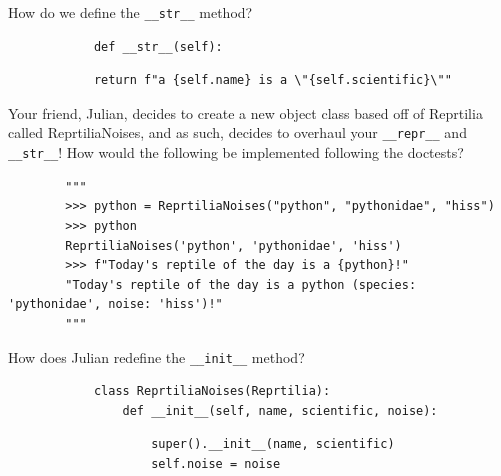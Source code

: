 \begin{blocksection}
    \question How do we define the \lstinline{__str__} method?

    \vspace{1.5\baselineskip}

    \begin{lstlisting}
            def __str__(self):
    \end{lstlisting}
    \begin{solution}[0.25in]
    \begin{lstlisting}
            return f"a {self.name} is a \"{self.scientific}\""
    \end{lstlisting}
    \end{solution}
\end{blocksection}

\begin{blocksection}
    \question Your friend, Julian, decides to create a new object class based off of Reprtilia called ReprtiliaNoises, and as such, decides to overhaul your \lstinline{__repr__} and \lstinline{__str__}! How would the following be implemented following the doctests?
    
    \vspace{1.5\baselineskip}

    \begin{lstlisting}
        """
        >>> python = ReprtiliaNoises("python", "pythonidae", "hiss")
        >>> python
        ReprtiliaNoises('python', 'pythonidae', 'hiss')
        >>> f"Today's reptile of the day is a {python}!"
        "Today's reptile of the day is a python (species: 'pythonidae', noise: 'hiss')!"
        """
    \end{lstlisting}

    \begin{blocksection}
        \question How does Julian redefine the \lstinline{__init__}  method?
    
        \vspace{1.5\baselineskip}
        
        \begin{lstlisting}
            class ReprtiliaNoises(Reprtilia):
                def __init__(self, name, scientific, noise):
        \end{lstlisting}
        \begin{solution}[0.25in]
        \begin{lstlisting}
                    super().__init__(name, scientific)
                    self.noise = noise
        \end{lstlisting}
        \end{solution}
    \end{blocksection}    
    

\end{blocksection}
